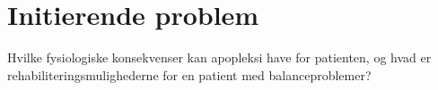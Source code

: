 \section{Initierende problem}
Hvilke fysiologiske konsekvenser kan apopleksi have for patienten, og hvad er rehabiliteringsmulighederne for en patient med balanceproblemer? 

% 
